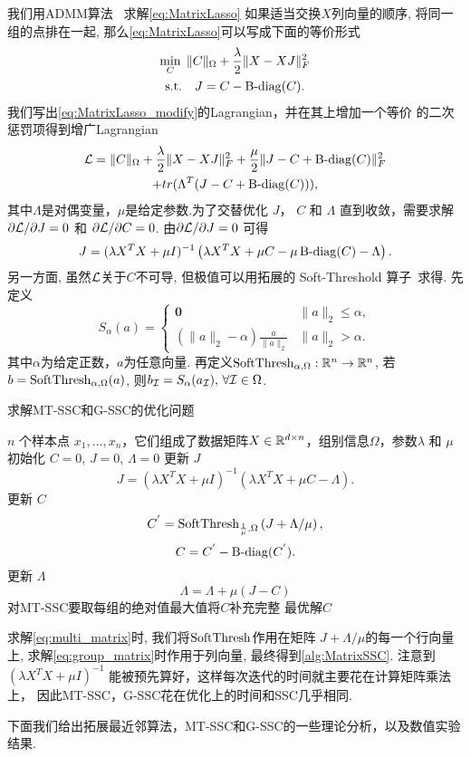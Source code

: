 我们用ADMM算法~\cite{stephen2011distributed} 求解\eqref{eq:MatrixLasso}
如果适当交换\(X\)列向量的顺序, 将同一组的点排在一起, 
那么\eqref{eq:MatrixLasso}可以写成下面的等价形式
\begin{equation}\label{eq:MatrixLasso_modify}
  \begin{gathered}
    \min_{C} \; \|C\|_{\Omega}+\frac{\lambda}{2}\|X-XJ\|_F^2 \\
    \text{s.t.} \quad J=C-\operatorname{B-diag}(C).
  \end{gathered}
\end{equation}
我们写出\eqref{eq:MatrixLasso_modify}的Lagrangian，并在其上增加一个等价
的二次惩罚项得到增广Lagrangian
\begin{multline*}
  \mathcal{L}= \|C\|_{\Omega}+\frac{\lambda}{2}\|X-XJ\|_F^2 
  +\frac{\mu}{2}\|J-C+\operatorname{B-diag}(C)\|_F^2\\
  +tr(\Lambda^T(J-C+\operatorname{B-diag}(C))),
\end{multline*}
其中\(\Lambda\)是对偶变量，\(\mu\)是给定参数.为了交替优化
\(J\)， \(C\) 和 \(\Lambda\) 直到收敛，需要求解 \(\partial \mathcal{L}/\partial J=0\)
和 \(\partial \mathcal{L}/\partial C=0\). 由\(\partial \mathcal{L}/\partial J=0\) 可得
\[
  J=(\lambda X^TX+\mu I)^{-1}\left(\lambda X^TX+\mu C - 
  \mu\operatorname{B-diag}(C)-\Lambda\right).
\]
另一方面, 虽然\(\mathcal{L}\)关于\(C\)不可导, 但极值可以用拓展的
Soft-Threshold 算子~\cite{donoho1995noising}求得.
先定义
\begin{equation*}
  S_\alpha(a) = \begin{cases}
    \mathbf{0} & \|a\|_2 \le \alpha, \\
    (\|a\|_2 - \alpha) \frac{a}{\|a\|_2} & \|a\|_2 > \alpha.
  \end{cases}
\end{equation*}
其中\(\alpha\)为给定正数，\(a\)为任意向量.
再定义\(\operatorname{SoftThresh}_{\alpha,\Omega}:\mathbb{R}^n\rightarrow \mathbb{R}^n\), 若
\(b =\operatorname{SoftThresh}_{\alpha,\Omega}(a)\), 则\( b_{\mathcal{I}}= S_\alpha(a_{\mathcal{I}}),
\, \forall \mathcal{I} \in \Omega\).

\begin{algorithm}[tb]
  \caption{求解MT-SSC和G-SSC的优化问题}
  \label{alg:MatrixSSC}
  \begin{algorithmic}
    \(n\) 个样本点 \(x_1,\ldots,x_n\)，它们组成了数据矩阵\(X\in \mathbb{R}^{d\times
    n}\)，组别信息\(\Omega\)，参数\(\lambda\) 和 \(\mu\)
    \State 初始化 \(C=0\), \(J=0\), \(\Lambda=0\)
     更新 \(J\) 
    \[J=(\lambda X^TX+\mu I)^{-1}(\lambda X^TX+\mu C-\Lambda).\]
     更新 \(C\)
    \[ C^{'}=\operatorname{SoftThresh}_{\frac{1}{\mu},\Omega}\left(J+\Lambda/\mu\right), \]
    \[ C=C^{'}-\operatorname{B-diag}(C^{'}).\]
     更新 \(\Lambda\)
    \[\Lambda=\Lambda+\mu(J-C)\]
    \EndWhile
    \State 对MT-SSC要取每组的绝对值最大值将\(C\)补充完整
     最优解\(C\)
  \end{algorithmic}
\end{algorithm}
求解\eqref{eq:multi_matrix}时, 我们将\(\operatorname{SoftThresh}\)作用在矩阵
\(J+\Lambda/\mu\)的每一个行向量上,
求解\eqref{eq:group_matrix}时作用于列向量,
最终得到\autoref{alg:MatrixSSC}.
注意到 \((\lambda X^TX+\mu I)^{-1}\)
能被预先算好，这样每次迭代的时间就主要花在计算矩阵乘法上，
因此MT-SSC，G-SSC花在优化上的时间和SSC几乎相同.

下面我们给出拓展最近邻算法，MT-SSC和G-SSC的一些理论分析，以及数值实验结果.

